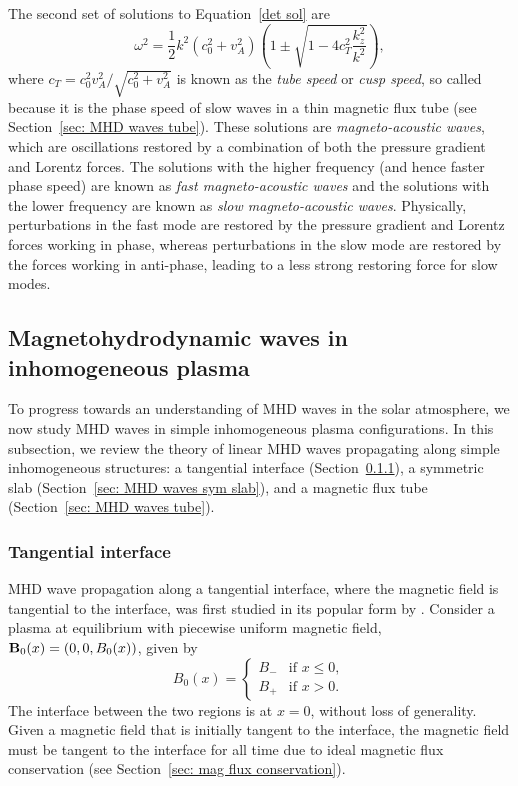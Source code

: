 The second set of solutions to Equation~\eqref{det sol} are
\begin{equation}
	\omega^2 = \frac{1}{2}k^2(c_0^2 + v_A^2)\left(1 \pm \sqrt{1 - 4c_T^2\frac{k_z^2}{k^2}}\right),
\end{equation}
where $c_T = c_0^2v_A^2/\sqrt{c_0^2 + v_A^2}$ is known as the \textit{tube speed} or \textit{cusp speed}, so called because it is the phase speed of slow waves in a thin magnetic flux tube (see Section~\ref{sec: MHD waves tube}). These solutions are \textit{magneto-acoustic waves}, which are oscillations restored by a combination of both the pressure gradient and Lorentz forces. The solutions with the higher frequency (and hence faster phase speed) are known as \textit{fast magneto-acoustic waves} and the solutions with the lower frequency are known as \textit{slow magneto-acoustic waves}. Physically, perturbations in the fast mode are restored by the pressure gradient and Lorentz forces working in phase, whereas perturbations in the slow mode are restored by the forces working in anti-phase, leading to a less strong restoring force for slow modes.


\subsection{Magnetohydrodynamic waves in inhomogeneous plasma}
To progress towards an understanding of MHD waves in the solar atmosphere, we now study MHD waves in simple inhomogeneous plasma configurations. In this subsection, we review the theory of linear MHD waves propagating along simple inhomogeneous structures: a tangential interface (Section~\ref{sec: MHD waves interface}), a symmetric slab (Section~\ref{sec: MHD waves sym slab}), and a magnetic flux tube (Section~\ref{sec: MHD waves tube}).


\subsubsection{Tangential interface} \label{sec: MHD waves interface}

MHD wave propagation along a tangential interface, where the magnetic field is tangential to the interface, was first studied in its popular form by \cite{rob81a}. Consider a plasma at equilibrium  with piecewise uniform magnetic field, $\mathbf{B}_0(x) = (0, 0, B_0(x))$, given by
\begin{equation}
	B_0(x) =
	\begin{cases}
		B_- & \text{if } x \leq 0, \\
		B_+ & \text{if } x > 0.
	\end{cases} \label{interface mag}
\end{equation}
The interface between the two regions is at $x = 0$, without loss of generality. Given a magnetic field that is initially tangent to the interface, the magnetic field must be tangent to the interface for all time due to ideal magnetic flux conservation (see Section~\ref{sec: mag flux conservation}).

